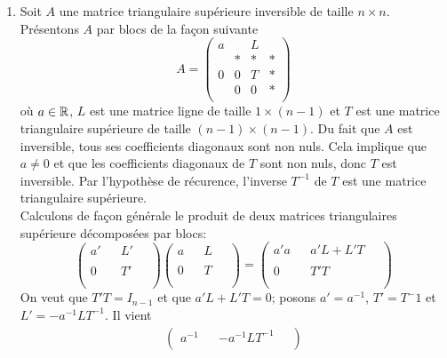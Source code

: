 \begin{enumerate}[(1)]
  \item Soit $A$ une matrice triangulaire supérieure inversible de taille $n\times n$. Présentons $A$ par blocs de la façon suivante
    $$A = \begin{pmatrix}
      a &   & L &   \\
        & * & * & * \\
      0 & 0 & T & * \\
        & 0 & 0 & * \\
    \end{pmatrix}$$
    où $a \in \mathbb{R}$, $L$ est une matrice ligne de taille $1 \times (n-1)$ et $T$ est une matrice triangulaire supérieure de taille $(n-1)\times(n-1)$. Du fait que $A$ est inversible, tous ses coefficients diagonaux sont non nuls. Cela implique que $a \neq 0$ et que les coefficients diagonaux de $T$ sont non nuls, donc $T$ est inversible. Par l'hypothèse de récurence, l'inverse $T^{-1}$ de $T$ est une matrice triangulaire supérieure. \\
    Calculons de façon générale le produit de deux matrices triangulaires supérieure décomposées par blocs:
    $$\begin{pmatrix}
        a' &   & L' & ~ \\
          &   &   &  ~  \\
        0 &   & T' & ~  \\
          &   &   &  ~ \\
      \end{pmatrix}
      \begin{pmatrix}
        a &   & L &  ~ \\
          &   &   &  ~ \\
        0 &   & T &  ~ \\
          &   &   &  ~ \\
      \end{pmatrix}
      =\begin{pmatrix}
        a' a &   & a' L + L' T & ~ \\
          &   &   & ~ \\
        0 &   & T' T & ~ \\
          &   &   & ~ \\
      \end{pmatrix}$$
    On veut que $T' T = I_{n-1}$ et que $a' L + L' T = 0$; posons $a' = a^{-1}$, $T' = T^-{1}$ et $L' = - a^{-1} L T^{-1}$. Il vient
    \begin{eqnarray*}
      \begin{pmatrix}
        a^{-1} &   & -a^{-1} L T^{-1} & ~ \\

\end{pmatrix}
\end{eqnarray*}
\end{enumerate}
